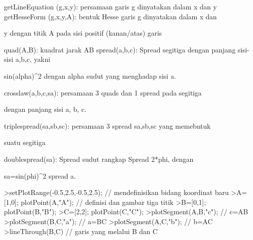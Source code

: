 \documentclass[a4paper,10pt]{article}
\begin{document}
\begin{eulernotebook}
\begin{eulercomment}
\begin{eulercomment}
\begin{eulercomment}
\end{eulercomment}
\begin{eulerttcomment}
  getLineEquation (g,x,y): persamaan garis g dinyatakan dalam x dan y
  getHesseForm (g,x,y,A): bentuk Hesse garis g dinyatakan dalam x dan
\end{eulerttcomment}
\begin{eulercomment}
y dengan titik A pada sisi positif (kanan/atas) garis\\
\end{eulercomment}
\begin{eulerttcomment}
  quad(A,B): kuadrat jarak AB
  spread(a,b,c): Spread segitiga dengan panjang sisi-sisi a,b,c, yakni
\end{eulerttcomment}
\begin{eulercomment}
sin(alpha)\textasciicircum{}2 dengan alpha sudut yang menghadap sisi a.\\
\end{eulercomment}
\begin{eulerttcomment}
  crosslaw(a,b,c,sa): persamaan 3 quads dan 1 spread pada segitiga
\end{eulerttcomment}
\begin{eulercomment}
dengan panjang sisi a, b, c.\\
\end{eulercomment}
\begin{eulerttcomment}
  triplespread(sa,sb,sc): persamaan 3 spread sa,sb,sc yang memebntuk
\end{eulerttcomment}
\begin{eulercomment}
suatu segitiga\\
\end{eulercomment}
\begin{eulerttcomment}
  doublespread(sa): Spread sudut rangkap Spread 2*phi, dengan
\end{eulerttcomment}
\begin{eulercomment}
sa=sin(phi)\textasciicircum{}2 spread a.
\end{eulercomment}
\begin{eulerprompt}
>setPlotRange(-0.5,2.5,-0.5,2.5); // mendefinisikan bidang koordinat baru
>A=[1,0]; plotPoint(A,"A"); // definisi dan gambar tiga titik
>B=[0,1]; plotPoint(B,"B");
>C=[2,2]; plotPoint(C,"C");
>plotSegment(A,B,"c"); // c=AB
>plotSegment(B,C,"a"); // a=BC
>plotSegment(A,C,"b"); // b=AC
>lineThrough(B,C) // garis yang melalui B dan C
\end{eulerprompt}
\begin{euleroutput}

\end{euleroutput}
\end{eulercomment}
\end{eulercomment}
\end{eulernotebook}
\end{document}
